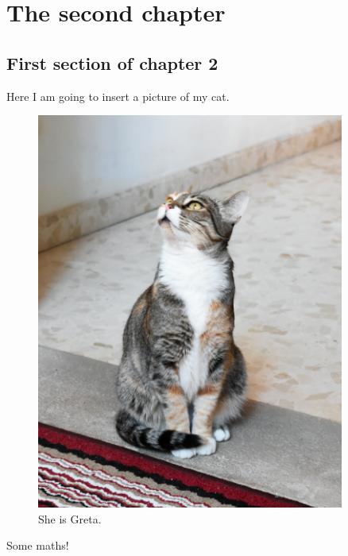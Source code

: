 \chapter{The second chapter}\label{chap2}
{
\hypersetup{linkcolor=\linkColorTOC}
\minitoc
}
\newpage


\begin{refsegment}

\section{First section of chapter 2}\label{sec:chap2.sec1}

Here I am going to insert a picture of my cat.

\begin{figure}[H]
    \centering
    \includegraphics[width=0.9\textwidth]{./chapter_2/figures/Greta.jpg}
    \caption{She is Greta.}
    \label{fig:Greta}
\end{figure}

Some maths!


\end{refsegment}
